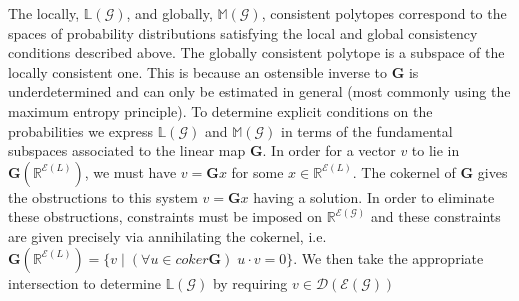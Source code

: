 The locally, $\mathbb{L}(\mathcal{G})$, and globally, $\mathbb{M}(\mathcal{G})$, consistent polytopes correspond to the spaces of probability distributions satisfying the local and global consistency conditions described above. The globally consistent polytope is a subspace of the locally consistent one. This is because an ostensible inverse to $\mathbf{G}$ is underdetermined and can only be estimated in general (most commonly using the maximum entropy principle).
To determine explicit conditions on the probabilities we express $\mathbb{L}(\mathcal{G})$ and $\mathbb{M}(\mathcal{G})$ in terms of the fundamental subspaces associated to the linear map $\mathbf{G}$. In order for a vector $v$ to lie in $\mathbf{G}(\mathbb{R}^{\mathcal{E}(L)})$, we must have $v=\mathbf{G}x$ for some $x \in \mathbb{R}^{\mathcal{E}(L)}$.  The cokernel of $\mathbf{G}$ gives the obstructions to this system $v=\mathbf{G}x$ having a solution. In order to eliminate these obstructions, constraints must be imposed on $\mathbb{R}^{\mathcal{E}(\mathcal{G})}$ and these constraints are given precisely via annihilating the cokernel, i.e. $\mathbf{G}(\mathbb{R}^{\mathcal{E}(L)}) = \{ v \; | \; (\forall u \in coker \mathbf{G}) \; u \cdot v = 0\}$.  We then take the appropriate intersection to determine $\mathbb{L}(\mathcal{G})$ by requiring $v \in \mathcal{D}(\mathcal{E}(\mathcal{G}))$
